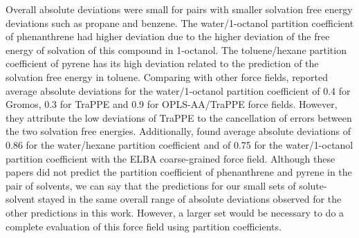 Overall absolute deviations were small for pairs with smaller solvation free energy deviations such as propane and benzene. The water/1-octanol partition coefficient of phenanthrene had higher deviation due to the higher deviation of the free energy of solvation of this compound in 1-octanol. The toluene/hexane partition coefficient of pyrene has its high deviation related to the prediction of the solvation free energy in toluene. Comparing with other force fields,  reported average absolute deviations for the water/1-octanol partition coefficient of 0.4 for Gromos, 0.3 for TraPPE and 0.9 for OPLS-AA/TraPPE force fields. However, they attribute the low deviations of TraPPE to the cancellation of errors between the two solvation free energies. Additionally,  found average absolute deviations of 0.86 for the water/hexane partition coefficient and of 0.75 for the water/1-octanol partition coefficient with the ELBA coarse-grained force field. Although these papers did not predict the partition coefficient of phenanthrene and pyrene in the pair of solvents, we can say that the predictions for our small sets of solute-solvent stayed in the same overall range of absolute deviations observed for the other predictions in this work. However, a larger set would be necessary to do a complete evaluation of this force field using partition coefficients. 